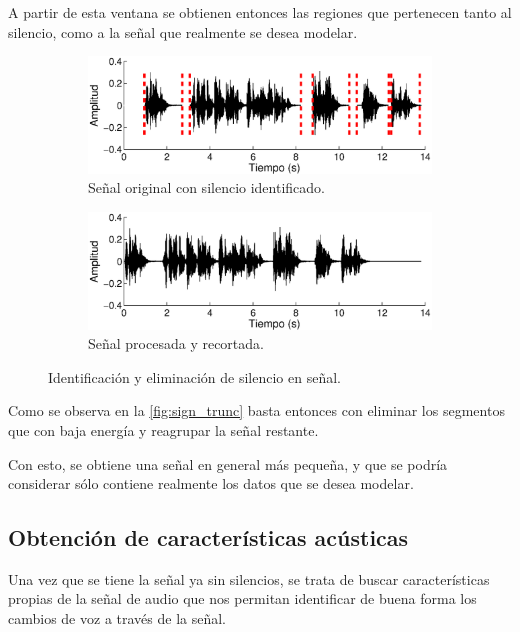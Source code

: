 A partir de esta ventana se obtienen entonces las regiones que pertenecen tanto al silencio, como a la señal que realmente se desea modelar.
  
\begin{figure}[ht]
  \begin{subfigure}[b]{\textwidth}
    \includegraphics[width=0.9\linewidth]{gfx/chap2/signal1}
    \caption{Señal original con silencio identificado.}
    \label{fig:sign_silence}  
  \end{subfigure}

  \begin{subfigure}[b]{\textwidth}
    \includegraphics[width=0.9\linewidth]{gfx/chap2/signal2}
    \caption{Señal procesada y recortada.}
    \label{fig:sign_trunc}  
  \end{subfigure}
  
  \caption{Identificación y eliminación de silencio en señal.}  
  \label{fig:sign_ident}  
\end{figure}

Como se observa en la \autoref{fig:sign_trunc} basta entonces con eliminar los segmentos que con baja energía y reagrupar la señal restante.

Con esto, se obtiene una señal en general más pequeña, y que se podría  considerar sólo contiene realmente los datos que se desea modelar.

\subsection{Obtención de características acústicas}

Una vez que se tiene la señal ya sin silencios, se trata de buscar características propias de la señal de audio que nos permitan identificar de buena forma los cambios de voz a través de la señal.

